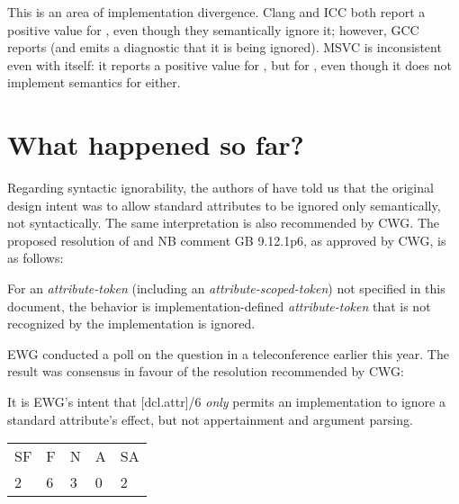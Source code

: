 This is an area of implementation divergence. Clang and ICC both report a positive value for \mbox{}, even though they semantically ignore it; however, GCC reports  (and emits a diagnostic that it is being ignored). MSVC is inconsistent even with itself: it reports a positive value for \mbox{}, but  for \mbox{}, even though it does not implement semantics for either.

\section{What happened so far?}

Regarding syntactic ignorability, the authors of \cite{N2761} have told us that the original design intent was to allow standard attributes to be ignored only semantically, not syntactically. The same interpretation is also recommended by CWG. The proposed resolution of \cite{CWG2538} and NB comment GB 9.12.1p6, as approved by CWG, is as follows:

\begin{adjustwidth}{0.5cm}{0.5cm}
For an \emph{attribute-token} (including an \emph{attribute-scoped-token})  not specified in this document, the behavior is implementation-defined \emph{attribute-token} that is not recognized by the implementation is ignored.

\end{adjustwidth}

EWG conducted a poll on the question in a teleconference earlier this year. The result was consensus in favour of the resolution recommended by CWG:

\begin{adjustwidth}{0.5cm}{0.5cm}
It is EWG's intent that [dcl.attr]/6 \emph{only} permits an implementation to ignore a standard attribute's effect, but not appertainment and argument parsing.

\begin{tabular}{lllll}
SF & F & N & A & SA \\
2 & 6 & 3 & 0 & 2
\end{tabular}
\end{adjustwidth}

